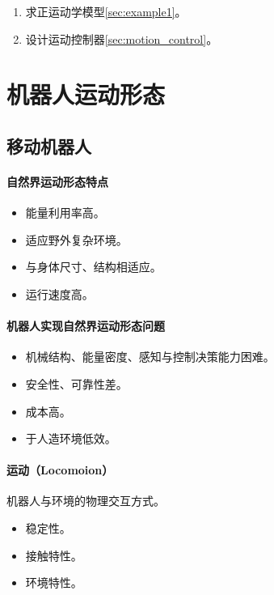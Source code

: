 \documentclass[
12pt, %
a4paper, 
oneside, %
headinclude,footinclude, %
]{scrartcl}
\begin{document}
\begin{enumerate}
\item 求正运动学模型\ref{sec:example1}。
\item 设计运动控制器\ref{sec:motion_control}。
\end{enumerate}
\section{机器人运动形态}
\subsection[移动机器人]{移动机器人}
\begin{minipage}{0.45\textwidth}
\paragraph{自然界运动形态特点}
\begin{itemize}
\item 能量利用率高。
\item 适应野外复杂环境。
\item 与身体尺寸、结构相适应。
\item 运行速度高。
\end{itemize}
\end{minipage}
\hfill
\begin{minipage}{0.45\textwidth}
\paragraph{机器人实现自然界运动形态问题}
\begin{itemize}
\item 机械结构、能量密度、感知与控制决策能力困难。
\item 安全性、可靠性差。
\item 成本高。
\item 于人造环境低效。
\end{itemize}
\end{minipage}
\paragraph{运动（Locomoion）}
机器人与环境的物理交互方式。
\begin{itemize}
\item 稳定性。
\item 接触特性。
\item 环境特性。
\end{itemize}
\end{document}

